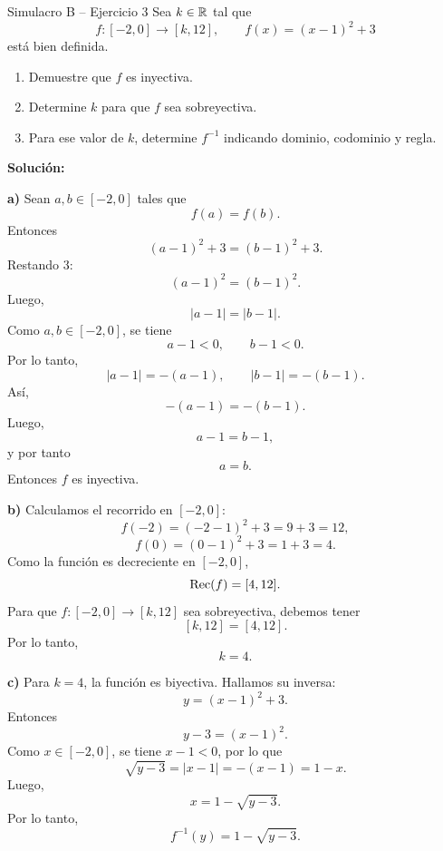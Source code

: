 \documentclass[letterpaper, 12pt]{article}
\begin{document}
\begin{solucionbox}{Simulacro B -- Ejercicio 3}
Sea $k\in\mathbb{R}$ tal que
\[
    f:[-2,0]\to[k,12],
    \qquad
    f(x)=(x-1)^2+3
\]
est\'a bien definida.
\begin{enumerate}[label=\textbf{\alph*)}]
    \item Demuestre que $f$ es inyectiva.
    \item Determine $k$ para que $f$ sea sobreyectiva.
    \item Para ese valor de $k$, determine $f^{-1}$ indicando dominio, codominio y regla.
\end{enumerate}

\textbf{Soluci\'on:}

\textbf{a)} Sean $a,b\in[-2,0]$ tales que
\[
    f(a)=f(b).
\]
Entonces
\[
    (a-1)^2+3=(b-1)^2+3.
\]
Restando $3$:
\[
    (a-1)^2=(b-1)^2.
\]
Luego,
\[
    |a-1|=|b-1|.
\]
Como $a,b\in[-2,0]$, se tiene
\[
    a-1<0,\qquad b-1<0.
\]
Por lo tanto,
\[
    |a-1|=-(a-1),
    \qquad
    |b-1|=-(b-1).
\]
As\'i,
\[
    -(a-1)=-(b-1).
\]
Luego,
\[
    a-1=b-1,
\]
y por tanto
\[
    a=b.
\]
Entonces $f$ es inyectiva.

\textbf{b)} Calculamos el recorrido en $[-2,0]$:
\[
    f(-2)=(-2-1)^2+3=9+3=12,
\]
\[
    f(0)=(0-1)^2+3=1+3=4.
\]
Como la funci\'on es decreciente en $[-2,0]$,
\[
    \operatorname{Rec}(f)=[4,12].
\]
Para que $f:[-2,0]\to[k,12]$ sea sobreyectiva, debemos tener
\[
    [k,12]=[4,12].
\]
Por lo tanto,
\[
    k=4.
\]

\textbf{c)} Para $k=4$, la funci\'on es biyectiva. Hallamos su inversa:
\[
    y=(x-1)^2+3.
\]
Entonces
\[
    y-3=(x-1)^2.
\]
Como $x\in[-2,0]$, se tiene $x-1<0$, por lo que
\[
    \sqrt{y-3}=|x-1|=-(x-1)=1-x.
\]
Luego,
\[
    x=1-\sqrt{y-3}.
\]
Por lo tanto,
\[
    f^{-1}(y)=1-\sqrt{y-3}.
\]

\end{solucionbox}
\end{document}
